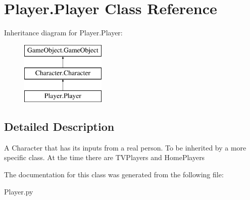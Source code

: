 \hypertarget{classPlayer_1_1Player}{\section{\-Player.\-Player \-Class \-Reference}
\label{classPlayer_1_1Player}
}
\-Inheritance diagram for \-Player.\-Player\-:\begin{figure}[H]
\begin{center}
\leavevmode
\includegraphics[height=3.000000cm]{classPlayer_1_1Player}
\end{center}
\end{figure}


\subsection{\-Detailed \-Description}
\begin{DoxyVerb}A Character that has its inputs from a real person. To be inherited by
a more specific class. At the time there are TVPlayers and HomePlayers
\end{DoxyVerb}
 

\-The documentation for this class was generated from the following file\-:\begin{DoxyCompactItemize}
\item 
\-Player.\-py\end{DoxyCompactItemize}
